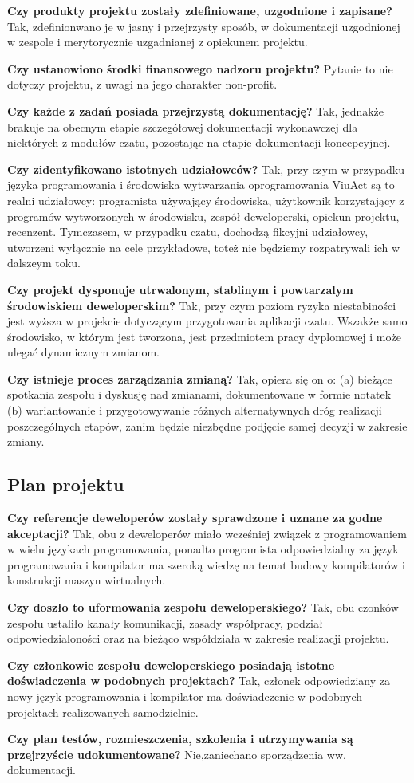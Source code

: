 \documentclass[11pt,oneside,a4paper,titlepage,onecolumn]{article}
\begin{document}
\textbf{Czy produkty projektu zostały zdefiniowane, uzgodnione i zapisane?} Tak, zdefinionwano je w jasny i przejrzysty sposób, w dokumentacji uzgodnionej w zespole i merytorycznie uzgadnianej z opiekunem projektu.

\textbf{Czy ustanowiono środki finansowego nadzoru projektu?} Pytanie to nie dotyczy projektu, z uwagi na jego charakter non-profit.

\textbf{Czy każde z zadań posiada przejrzystą dokumentację?} Tak, jednakże brakuje na obecnym etapie szczegółowej dokumentacji wykonawczej dla niektórych z modułów czatu, pozostając na etapie dokumentacji koncepcyjnej.

\textbf{Czy zidentyfikowano istotnych udziałowców?} Tak, przy czym w przypadku języka programowania i środowiska wytwarzania oprogramowania ViuAct są to realni udziałowcy: programista używający środowiska, użytkownik korzystający z programów wytworzonych w środowisku, zespół deweloperski, opiekun projektu, recenzent. Tymczasem, w przypadku czatu, dochodzą fikcyjni udziałowcy, utworzeni wyłącznie na cele przykładowe, toteż nie będziemy rozpatrywali ich w dalszeym toku.

\textbf{Czy projekt dysponuje utrwalonym, stablinym i powtarzalym środowiskiem deweloperskim?} Tak, przy czym poziom ryzyka niestabiności jest wyższa w projekcie dotyczącym przygotowania aplikacji czatu. Wszakże samo środowisko, w którym jest tworzona, jest przedmiotem pracy dyplomowej i może ulegać dynamicznym zmianom.

\textbf{Czy istnieje proces zarządzania zmianą?} Tak, opiera się on o: (a) bieżące spotkania zespołu i dyskusję nad zmianami, dokumentowane w formie notatek (b) wariantowanie i przygotowywanie różnych alternatywnych dróg realizacji poszczególnych etapów, zanim będzie niezbędne podjęcie samej decyzji w zakresie zmiany.

\subsection{Plan projektu}

\textbf{Czy referencje deweloperów zostały sprawdzone i uznane za godne akceptacji?} Tak, obu z deweloperów miało wcześniej związek z programowaniem w wielu językach programowania, ponadto programista odpowiedzialny za język programowania i kompilator ma szeroką wiedzę na temat budowy kompilatorów i konstrukcji maszyn wirtualnych.

\textbf{Czy doszło to uformowania zespołu deweloperskiego?} Tak, obu czonków zespołu ustaliło kanały komunikacji, zasady współpracy, podział odpowiedzialoności oraz na bieżąco współdziała w zakresie realizacji projektu.

\textbf{Czy członkowie zespołu deweloperskiego posiadają istotne doświadczenia w podobnych projektach?} Tak, członek odpowiedziany za nowy język programowania i kompilator ma doświadczenie w podobnych projektach realizowanych samodzielnie.

\textbf{Czy plan testów, rozmieszczenia, szkolenia i utrzymywania są przejrzyście udokumentowane?} Nie,zaniechano sporządzenia ww. dokumentacji.
\end{document}
